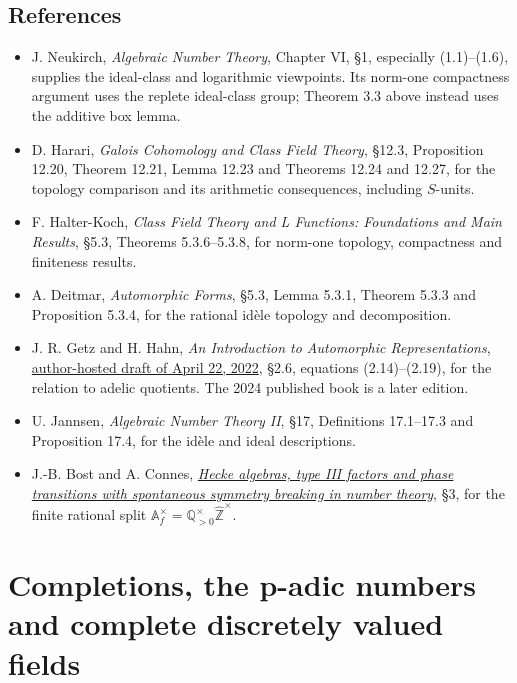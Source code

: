 \documentclass[
  english,
  11pt,
  a4paper,
]{article}
\providecommand{\tightlist}{%
  \setlength{\itemsep}{0pt}\setlength{\parskip}{0pt}}
\begin{document}
\subsection{References}\label{NT-ADL-03--references}

\begin{itemize}
\tightlist
\item
  J. Neukirch, \emph{Algebraic Number Theory}, Chapter VI, §1,
  especially (1.1)--(1.6), supplies the ideal-class and logarithmic
  viewpoints. Its norm-one compactness argument uses the replete
  ideal-class group; Theorem 3.3 above instead uses the additive box
  lemma.
\item
  D. Harari, \emph{Galois Cohomology and Class Field Theory}, §12.3,
  Proposition 12.20, Theorem 12.21, Lemma 12.23 and Theorems 12.24 and
  12.27, for the topology comparison and its arithmetic consequences,
  including \(S\)-units.
\item
  F. Halter-Koch, \emph{Class Field Theory and L Functions: Foundations
  and Main Results}, §5.3, Theorems 5.3.6--5.3.8, for norm-one topology,
  compactness and finiteness results.
\item
  A. Deitmar, \emph{Automorphic Forms}, §5.3, Lemma 5.3.1, Theorem 5.3.3
  and Proposition 5.3.4, for the rational idèle topology and
  decomposition.
\item
  J. R. Getz and H. Hahn, \emph{An Introduction to Automorphic
  Representations},
  \href{https://sites.duke.edu/jgetz/files/2022/04/Graduate_Text.pdf}{author-hosted
  draft of April 22, 2022}, §2.6, equations (2.14)--(2.19), for the
  relation to adelic quotients. The 2024 published book is a later
  edition.
\item
  U. Jannsen, \emph{Algebraic Number Theory II}, §17, Definitions
  17.1--17.3 and Proposition 17.4, for the idèle and ideal descriptions.
\item
  J.-B. Bost and A. Connes,
  \href{https://doi.org/10.1007/BF01589495}{\emph{Hecke algebras, type
  III factors and phase transitions with spontaneous symmetry breaking
  in number theory}}, §3, for the finite rational split
  \(\mathbb A_f^\times=\mathbb Q_{>0}^\times\widehat{\mathbb Z}^{\times}\).
\end{itemize}

\section{Completions, the p-adic numbers and complete discretely valued
fields}\label{NT-LOC-02}
\end{document}
